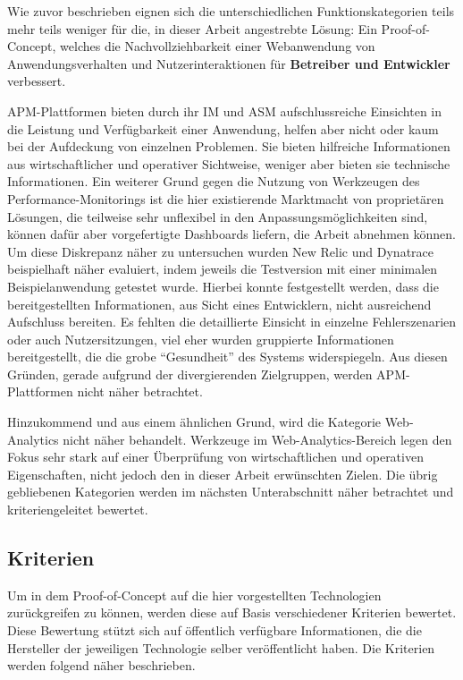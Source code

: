 Wie zuvor beschrieben eignen sich die unterschiedlichen Funktionskategorien teils mehr teils weniger für die, in dieser Arbeit angestrebte Lösung: Ein Proof-of-Concept, welches die Nachvollziehbarkeit einer Webanwendung von Anwendungsverhalten und Nutzerinteraktionen für \textbf{Betreiber und Entwickler} verbessert.

APM-Plattformen bieten durch ihr IM und ASM aufschlussreiche Einsichten in die Leistung und Verfügbarkeit einer Anwendung, helfen aber nicht oder kaum bei der Aufdeckung von einzelnen Problemen. Sie bieten hilfreiche Informationen aus wirtschaftlicher und operativer Sichtweise, weniger aber bieten sie technische Informationen. Ein weiterer Grund gegen die Nutzung von Werkzeugen des Performance-Monitorings ist die hier existierende Marktmacht von proprietären Lösungen, die teilweise sehr unflexibel in den Anpassungsmöglichkeiten sind, können dafür aber vorgefertigte Dashboards liefern, die Arbeit abnehmen können. Um diese Diskrepanz näher zu untersuchen wurden New Relic und Dynatrace beispielhaft näher evaluiert, indem jeweils die Testversion mit einer minimalen Beispielanwendung getestet wurde. Hierbei konnte festgestellt werden, dass die bereitgestellten Informationen, aus Sicht eines Entwicklern, nicht ausreichend Aufschluss bereiten. Es fehlten die detaillierte Einsicht in einzelne Fehlerszenarien oder auch Nutzersitzungen, viel eher wurden gruppierte Informationen bereitgestellt, die die grobe \enquote{Gesundheit} des Systems widerspiegeln. Aus diesen Gründen, gerade aufgrund der divergierenden Zielgruppen, werden APM-Plattformen nicht näher betrachtet.

Hinzukommend und aus einem ähnlichen Grund, wird die Kategorie Web-Analytics nicht näher behandelt. Werkzeuge im Web-Analytics-Bereich legen den Fokus sehr stark auf einer Überprüfung von wirtschaftlichen und operativen Eigenschaften, nicht jedoch den in dieser Arbeit erwünschten Zielen. Die übrig gebliebenen Kategorien werden im nächsten Unterabschnitt näher betrachtet und kriteriengeleitet bewertet.

\subsection{Kriterien}

Um in dem Proof-of-Concept auf die hier vorgestellten Technologien zurückgreifen zu können, werden diese auf Basis verschiedener Kriterien bewertet. Diese Bewertung stützt sich auf öffentlich verfügbare Informationen, die die Hersteller der jeweiligen Technologie selber veröffentlicht haben. Die Kriterien werden folgend näher beschrieben.

